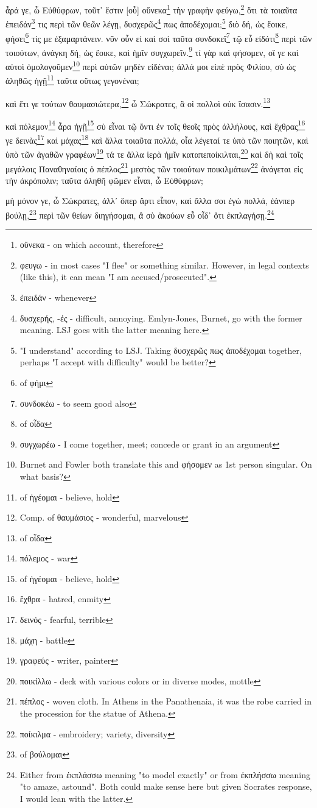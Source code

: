 ἆρά
γε,
ὦ
Εὐθύφρων,
τοῦτ᾽
ἔστιν
[οὗ]
οὕνεκα\footnote{οὕνεκα - on which account, therefore}
τὴν
γραφὴν
φεύγω,\footnote{φευγω - in most cases "I flee" or something similar. However, in legal contexts (like this), it can mean "I am accused/prosecuted".}
ὅτι
τὰ
τοιαῦτα
ἐπειδάν\footnote{ἐπειδάν - whenever}
τις
περὶ
τῶν
θεῶν
λέγῃ,
δυσχερῶς\footnote{δυσχερής, -ές - difficult, annoying. Emlyn-Jones, Burnet, go with the former meaning. LSJ goes with the latter meaning here.}
πως
ἀποδέχομαι;\footnote{"I understand" according to LSJ. Taking δυσχερῶς πως ἀποδέχομαι together, perhaps "I accept with difficulty" would be better?}
διὸ
δή,
ὡς
ἔοικε,
φήσει\footnote{ of φήμι}
τίς
με
ἐξαμαρτάνειν.
νῦν
οὖν
εἰ
καὶ
σοὶ
ταῦτα
συνδοκεῖ\footnote{συνδοκέω - to seem good also}
τῷ
\versification{[6b]}
εὖ
εἰδότι\footnote{ of οἶδα}
περὶ
τῶν
τοιούτων,
ἀνάγκη
δή,
ὡς
ἔοικε,
καὶ
ἡμῖν
συγχωρεῖν.\footnote{συγχωρέω - I come together, meet; concede or grant in an argument}
τί
γὰρ
καὶ
φήσομεν,
οἵ
γε
καὶ
αὐτοὶ
ὁμολογοῦμεν\footnote{Burnet and Fowler both translate this and φήσομεν as 1st person singular. On what basis?}
περὶ
αὐτῶν
μηδὲν
εἰδέναι;
ἀλλά
μοι
εἰπὲ
πρὸς
Φιλίου,
σὺ
ὡς
ἀληθῶς
ἡγῇ\footnote{ of ἡγέομαι - believe, hold}
ταῦτα
οὕτως
γεγονέναι;

καὶ
ἔτι
γε
τούτων
θαυμασιώτερα,\footnote{Comp. of θαυμάσιος - wonderful, marvelous}
ὦ
Σώκρατες,
ἃ
οἱ
πολλοὶ
οὐκ
ἴσασιν.\footnote{ of οἶδα}

καὶ
πόλεμον\footnote{πόλεμος - war}
ἆρα
ἡγῇ\footnote{ of ἡγέομαι - believe, hold}
σὺ
εἶναι
τῷ
ὄντι
ἐν
τοῖς
θεοῖς
πρὸς
ἀλλήλους,
καὶ
ἔχθρας\footnote{ἔχθρα - hatred, enmity}
γε
δεινὰς\footnote{δεινός - fearful, terrible}
καὶ
μάχας\footnote{μάχη - battle}
καὶ
ἄλλα
τοιαῦτα
πολλά,
οἷα
λέγεταί
τε
ὑπὸ
τῶν
ποιητῶν,
καὶ
ὑπὸ
τῶν
\versification{[6c]}
ἀγαθῶν
γραφέων\footnote{γραφεύς - writer, painter}
τά
τε
ἄλλα
ἱερὰ
ἡμῖν
καταπεποίκιλται,\footnote{ποικίλλω - deck with various colors or in diverse modes, mottle}
καὶ
δὴ
καὶ
τοῖς
μεγάλοις
Παναθηναίοις
ὁ
πέπλος\footnote{πέπλος - woven cloth. In Athens in the Panathenaia, it was the robe carried in the procession for the statue of Athena.}
μεστὸς
τῶν
τοιούτων
ποικιλμάτων\footnote{ποίκιλμα - embroidery; variety, diversity}
ἀνάγεται
εἰς
τὴν
ἀκρόπολιν;
ταῦτα
ἀληθῆ
φῶμεν
εἶναι,
ὦ
Εὐθύφρων;

μὴ
μόνον
γε,
ὦ
Σώκρατες,
ἀλλ᾽
ὅπερ
ἄρτι
εἶπον,
καὶ
ἄλλα
σοι
ἐγὼ
πολλά,
ἐάνπερ
βούλῃ,\footnote{ of βούλομαι}
περὶ
τῶν
θείων
διηγήσομαι,
ἃ
σὺ
ἀκούων
εὖ
οἶδ᾽
ὅτι
ἐκπλαγήσῃ.\footnote{Either from ἐκπλάσσω meaning "to model exactly" or from ἐκπλήσσω meaning "to amaze, astound". Both could make sense here but given Socrates response, I would lean with the latter.}

